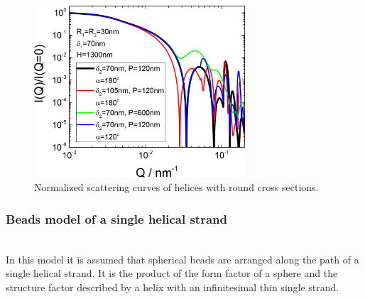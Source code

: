 \begin{figure}[htb]
\begin{center}
\includegraphics[width=0.7\textwidth]{../images/form_factor/cylindrical_obj/helix_round_IQ.png}
\end{center}
\caption{Normalized scattering curves of helices with round cross sections.}
\label{fig:helixroundIQ}
\end{figure}

\newpage
\subsubsection{Beads model of a single helical strand} ~\\
In this model  \cite{Lebedev2003,Avdeev2013} it is assumed that spherical beads are arranged along the path of a single helical strand. It is the product of the form factor of a sphere and the structure factor described by a helix with an infinitesimal thin single strand.

